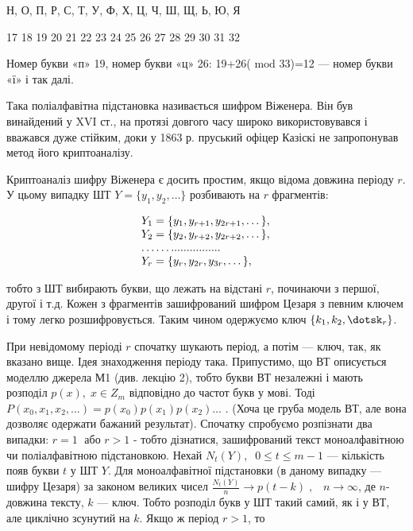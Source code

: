  Н,   О,   П,   Р,   С,  Т,   У,   Ф,   Х,   Ц,  Ч,   Ш,  Щ,  Ь,   Ю,   Я

  17   18   19  20  21  22   23   24   25  26  27   28  29  30  31  32


\bigskip

 Номер букви «п» 19, номер букви «ц» 26:  19+26( ${\text{mod}}$ 33)=12 --- номер
букви «ї» і так далі.

Така поліалфавітна  підстановка називається шифром Віженера. Він був винайдений
у XVI\textit{ }ст., на протязі довгого часу широко використовувався і вважався
дуже стійким, доки у 1863 р. пруський офіцер Казіскі не запропонував метод його
криптоаналізу. 

Криптоаналіз шифру Віженера є досить простим, якщо відома довжина періоду 
${r}$. У цьому випадку ШТ  ${Y=\{y_{{1}},y_{{2}},\dots\}}$
розбивають на  ${r}$ фрагментів:

\begin{equation*}
\begin{matrix}{Y_{{1}}=\{y_{{1}},y_{{r+1}},y_{{2r+1}},\dots\},}\hfill\null
\\Y_{{2}}=\{y_{{2}},y_{{r+2}},y_{{2r+2}},\dots\},\hfill\null
\\\dots\dots\text{.}\text{.}\text{.}\text{.}\text{.}\text{.}\text{.}\text{.}\text{.}\text{.}\text{.}\text{.}\text{.}\text{.}\text{.}\text{.}\hfill\null
\\Y_{{r}}=\{y_{{r}},y_{{2r}},y_{{3r}},\dots\},\hfill\null
\end{matrix}\hfill 
\end{equation*}

\bigskip

тобто з ШТ вибирають букви, що лежать на відстані  ${r}$, починаючи з першої,
другої і т.д. Кожен з фрагментів зашифрований шифром Цезаря з певним ключем і
тому легко розшифровується. Таким чином одержуємо ключ 
${\{k_{{1}},k_{{2}},\dotsk_{{r}}\}}$. 

При невідомому періоді  ${r}$ спочатку шукають період, а потім --- ключ, так, як
вказано вище. Ідея знаходження періоду така. Припустимо, що ВТ описується
моделлю джерела  М1 (див. лекцію 2), тобто букви ВТ незалежні і мають розподіл 
${p(x),\;x\in Z_{{m}}}$ відповідно до частот букв у мові. Тоді 
${P(x_{{0}},x_{{1}},x_{{2}},\dots)=p(x_{{0}})p(x_{{1}})p(x_{{2}})\dots}$
. (Хоча це груба модель ВТ, але вона дозволяє одержати бажаний результат).
Спочатку спробуємо розпізнати два випадки:  ${r=1\;}$ або  ${r>1}$ - тобто
дізнатися, зашифрований текст моноалфавітною чи поліалфавітною підстановкою.
Нехай  ${N_{{t}}(Y),\;\;0\le t\le m-1}$ --- кількість появ букви  ${t}$ у ШТ 
${Y}$. Для моноалфавітної підстановки (в даному випадку --- шифру Цезаря) за
законом великих чисел  ${\frac{N_{{t}}(Y)}{n}\rightarrow
p(t-k)\;,\;\;\;n\rightarrow \infty }$, де  ${n}${}- довжина тексту,  ${k}$ ---
ключ. Тобто розподіл букв у ШТ такий самий, як і у ВТ, але циклічно зсунутий на
 ${k}$. Якщо ж період  ${r>1}$, то 

